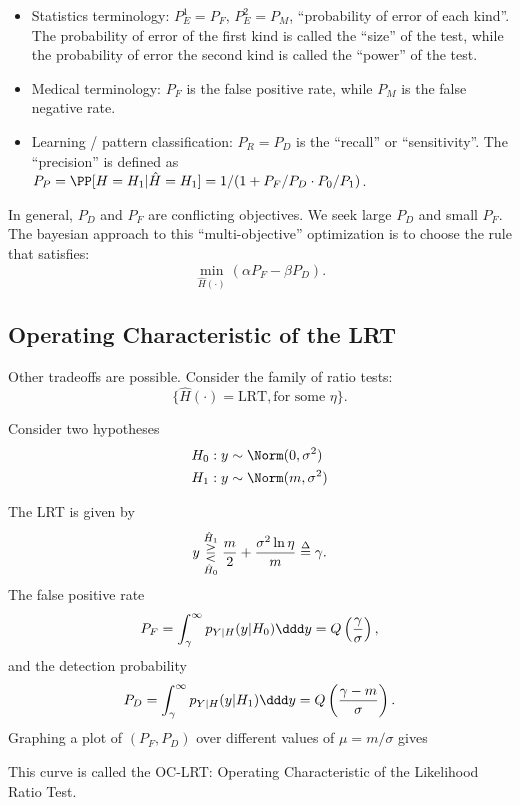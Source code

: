 \begin{itemize}
	\item Statistics terminology: $P_E^1 = P_F$, $P_E^2 = P_M$, ``probability of error of each kind''. The probability of error of the first kind is called the ``size'' of the test, while the probability of error the second kind is called the ``power'' of the test. 
	\item Medical terminology: $P_F$ is the false positive rate, while $P_M$ is the false negative rate. 
	\item Learning / pattern classification: $P_R = P_D$ is the ``recall'' or ``sensitivity''. The ``precision'' is defined as $P_P = \PP[H=H_1|\hat{H}=H_1] = 1 / (1 + P_F/P_D\cdot P_0/P_1)$. 
\end{itemize}

In general, $P_D$ and $P_F$ are conflicting objectives. We seek large $P_D$ and small $P_F$. The bayesian approach to this ``multi-objective'' optimization is to choose the rule that satisfies: 
\[\min_{\hat{H}(\cdot)}(\alpha P_F - \beta P_D).\]

\subsection{Operating Characteristic of the LRT} 
Other tradeoffs are possible. Consider the family of ratio tests: 
\[\{\hat{H}(\cdot) = \text{LRT}, \text{for some }\eta\}.\] 

\begin{example}
\exlabel

Consider two hypotheses
\begin{align*}
	H_0 &: y\sim \Norm(0,\sigma^2) \\
	H_1 &: y\sim \Norm(m,\sigma^2)
\end{align*} 
\end{example}

The LRT is given by 
\[y \overunderset{\hat{H}_1}{\hat{H}_0}{\gtreqless} \frac{m}{2} + \frac{\sigma^2\ln \eta}{m} \overset{\Delta}{=}\gamma.\] 
The false positive rate
\[P_F = \int_{\gamma}^{\infty}p_{Y|H}(y|H_0)\ddd y = Q\left(\frac{\gamma}{\sigma}\right),\] 
and the detection probability 
\[P_D = \int_{\gamma}^{\infty}p_{Y|H}(y|H_1)\ddd y = Q\left(\frac{\gamma - m}{\sigma}\right).\]
Graphing a plot of $(P_F, P_D)$ over different values of $\mu = m/\sigma$ gives 


This curve is called the \ac{OC-LRT}: Operating Characteristic of the Likelihood Ratio Test. 

